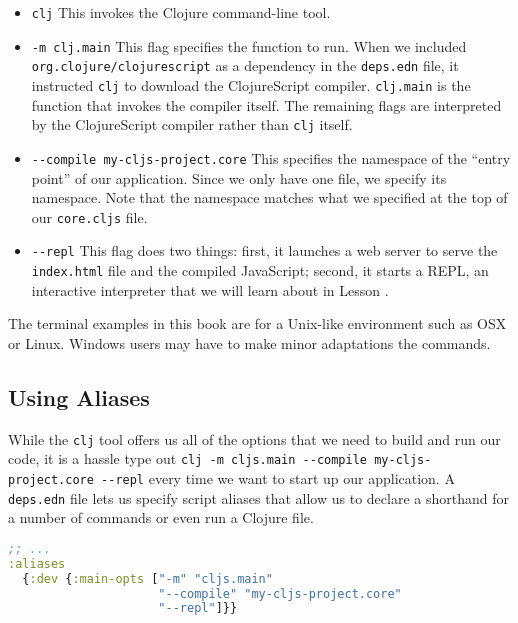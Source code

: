 \documentclass[10pt,twoside,openright]{memoir}
\begin{document}
\begin{itemize}
\tightlist
\item
  \texttt{clj} This invokes the Clojure command-line tool.
\item
  \texttt{-m\ clj.main} This flag specifies the function to run. When we
  included \texttt{org.clojure/clojurescript} as a dependency in the
  \texttt{deps.edn} file, it instructed \texttt{clj} to download the
  ClojureScript compiler. \texttt{clj.main} is the function that invokes
  the compiler itself. The remaining flags are interpreted by the
  ClojureScript compiler rather than \texttt{clj} itself.
\item
  \texttt{-\/-compile\ my-cljs-project.core} This specifies the
  namespace of the ``entry point'' of our application. Since we only
  have one file, we specify its namespace. Note that the namespace
  matches what we specified at the top of our \texttt{core.cljs} file.
\item
  \texttt{-\/-repl} This flag does two things: first, it launches a web
  server to serve the \texttt{index.html} file and the compiled
  JavaScript; second, it starts a REPL, an interactive interpreter that
  we will learn about in Lesson .
\end{itemize}

\begin{notice}[title={Terminal Environment}]
The terminal examples in this book are for a Unix-like environment such
as OSX or Linux. Windows users may have to make minor adaptations the
commands.
\end{notice}

\subsection{Using Aliases}

While the \texttt{clj} tool offers us all of the options that we need to
build and run our code, it is a hassle type out
\texttt{clj\ -m\ cljs.main\ -\/-compile\ my-cljs-project.core\ -\/-repl}
every time we want to start up our application. A \texttt{deps.edn} file
lets us specify script aliases that allow us to declare a shorthand for
a number of commands or even run a Clojure file.

\begin{lstlisting}[language=Clojure, caption={deps.edn}]
;; ...
:aliases
  {:dev {:main-opts ["-m" "cljs.main"
                     "--compile" "my-cljs-project.core"
                     "--repl"]}}
\end{lstlisting}
\end{document}

